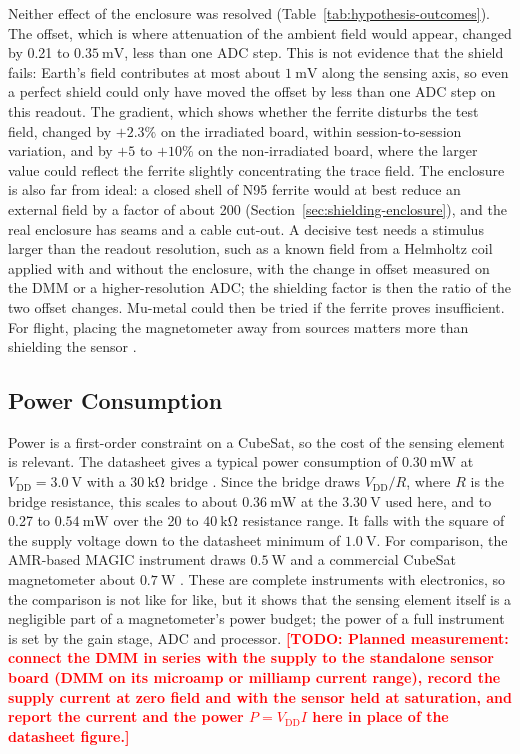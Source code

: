 \documentclass[12pt,a4paper]{article}
\newcommand{\todo}[1]{\textcolor{red}{\textbf{[TODO: #1]}}}
\begin{document}
Neither effect of the enclosure was resolved (Table~\ref{tab:hypothesis-outcomes}). The offset, which is where attenuation of the ambient field would appear, changed by 0.21 to $\SI{0.35}{\milli\volt}$, less than one ADC step. This is not evidence that the shield fails: Earth's field contributes at most about $\SI{1}{\milli\volt}$ along the sensing axis, so even a perfect shield could only have moved the offset by less than one ADC step on this readout. The gradient, which shows whether the ferrite disturbs the test field, changed by $+2.3\%$ on the irradiated board, within session-to-session variation, and by $+5$ to $+10\%$ on the non-irradiated board, where the larger value could reflect the ferrite slightly concentrating the trace field. The enclosure is also far from ideal: a closed shell of N95 ferrite would at best reduce an external field by a factor of about 200 (Section~\ref{sec:shielding-enclosure}), and the real enclosure has seams and a cable cut-out. A decisive test needs a stimulus larger than the readout resolution, such as a known field from a Helmholtz coil applied with and without the enclosure, with the change in offset measured on the DMM or a higher-resolution ADC; the shielding factor is then the ratio of the two offset changes. Mu-metal could then be tried if the ferrite proves insufficient. For flight, placing the magnetometer away from sources matters more than shielding the sensor \cite{nss_magnetometer}.

\subsection{Power Consumption}
\label{sec:disc-power}

Power is a first-order constraint on a CubeSat, so the cost of the sensing element is relevant. The datasheet gives a typical power consumption of $\SI{0.30}{\milli\watt}$ at $V_{\text{DD}} = \SI{3.0}{\volt}$ with a $\SI{30}{\kilo\ohm}$ bridge \cite{ct100_datasheet}. Since the bridge draws $V_{\text{DD}}/R$, where $R$ is the bridge resistance, this scales to about $\SI{0.36}{\milli\watt}$ at the $\SI{3.30}{\volt}$ used here, and to 0.27 to $\SI{0.54}{\milli\watt}$ over the 20 to $\SI{40}{\kilo\ohm}$ resistance range. It falls with the square of the supply voltage down to the datasheet minimum of $\SI{1.0}{\volt}$. For comparison, the AMR-based MAGIC instrument draws $\SI{0.5}{\watt}$ \cite{magic-radcube} and a commercial CubeSat magnetometer about $\SI{0.7}{\watt}$ \cite{nss_magnetometer}. These are complete instruments with electronics, so the comparison is not like for like, but it shows that the sensing element itself is a negligible part of a magnetometer's power budget; the power of a full instrument is set by the gain stage, ADC and processor. \todo{Planned measurement: connect the DMM in series with the supply to the standalone sensor board (DMM on its microamp or milliamp current range), record the supply current at zero field and with the sensor held at saturation, and report the current and the power $P = V_{\text{DD}} I$ here in place of the datasheet figure.}
\end{document}
